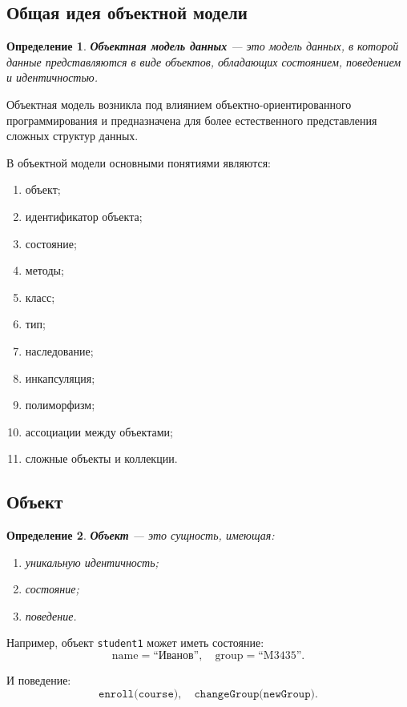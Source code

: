 \documentclass[12pt,a4paper]{article}
\newtheorem{definition}{Определение}[section]
\theoremstyle{remark}
\begin{document}
\subsection{Общая идея объектной модели}

\begin{definition}
\textbf{Объектная модель данных} --- это модель данных, в которой данные представляются в виде объектов, обладающих состоянием, поведением и идентичностью.
\end{definition}

Объектная модель возникла под влиянием объектно-ориентированного программирования и предназначена для более естественного представления сложных структур данных.

В объектной модели основными понятиями являются:
\begin{enumerate}
    \item объект;
    \item идентификатор объекта;
    \item состояние;
    \item методы;
    \item класс;
    \item тип;
    \item наследование;
    \item инкапсуляция;
    \item полиморфизм;
    \item ассоциации между объектами;
    \item сложные объекты и коллекции.
\end{enumerate}

\subsection{Объект}

\begin{definition}
\textbf{Объект} --- это сущность, имеющая:
\begin{enumerate}
    \item уникальную идентичность;
    \item состояние;
    \item поведение.
\end{enumerate}
\end{definition}

Например, объект \texttt{student1} может иметь состояние:
\[
\text{name} = \text{``Иванов''},
\quad
\text{group} = \text{``M3435''}.
\]

И поведение:
\[
\texttt{enroll(course)},
\quad
\texttt{changeGroup(newGroup)}.
\]
\end{document}

